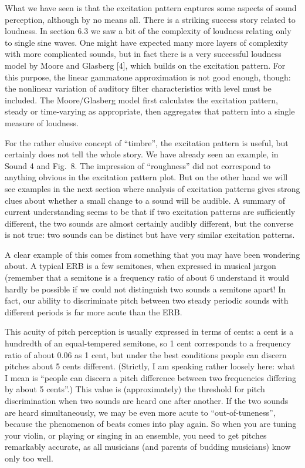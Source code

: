 
  What we have seen is that the excitation pattern captures some aspects of 
  sound perception, although by no means all. There is a striking success story 
  related to loudness. In section 6.3 we saw a bit of the complexity of 
  loudness relating only to single sine waves. One might have expected many 
  more layers of complexity with more complicated sounds, but in fact there is 
  a very successful loudness model by Moore and Glasberg [4], which builds on 
  the excitation pattern. For this purpose, the linear gammatone approximation 
  is not good enough, though: the nonlinear variation of auditory filter 
  characteristics with level must be included. The Moore/Glasberg model first 
  calculates the excitation pattern, steady or time-varying as appropriate, 
  then aggregates that pattern into a single measure of loudness. 

  For the rather elusive concept of ``timbre'', the excitation pattern is 
  useful, but certainly does not tell the whole story. We have already seen an 
  example, in Sound 4 and Fig.\ 8. The impression of ``roughness'' did not 
  correspond to anything obvious in the excitation pattern plot. But on the 
  other hand we will see examples in the next section where analysis of 
  excitation patterns gives strong clues about whether a small change to a 
  sound will be audible. A summary of current understanding seems to be that if 
  two excitation patterns are sufficiently different, the two sounds are almost 
  certainly audibly different, but the converse is not true: two sounds can be 
  distinct but have very similar excitation patterns. 

  A clear example of this comes from something that you may have been wondering 
  about. A typical ERB is a few semitones, when expressed in musical jargon 
  (remember that a semitone is a frequency ratio of about 6%
  understand it would hardly be possible if we could not distinguish two sounds 
  a semitone apart! In fact, our ability to discriminate pitch between two 
  steady periodic sounds with different periods is far more acute than the ERB. 

  This acuity of pitch perception is usually expressed in terms of cents: a 
  cent is a hundredth of an equal-tempered semitone, so 1 cent corresponds to a 
  frequency ratio of about 0.06%
  as 1 cent, but under the best conditions people can discern pitches about 5 
  cents different. (Strictly, I am speaking rather loosely here: what I mean is 
  ``people can discern a pitch difference between two frequencies differing by 
  about 5 cents''.) This value is (approximately) the threshold for pitch 
  discrimination when two sounds are heard one after another. If the two sounds 
  are heard simultaneously, we may be even more acute to ``out-of-tuneness'', 
  because the phenomenon of beats comes into play again. So when you are tuning 
  your violin, or playing or singing in an ensemble, you need to get pitches 
  remarkably accurate, as all musicians (and parents of budding musicians) know 
  only too well. 

